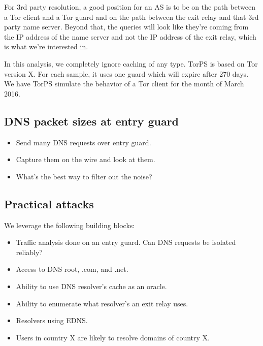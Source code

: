 For 3rd party resolution, a good position for an AS is to be on the path between 
a Tor client and a Tor guard and on the path between the exit relay and that 3rd party 
name server. Beyond that, the queries will look like they're coming from the IP address 
of the name server and not the IP address of the exit relay, which is what we're interested 
in. 

In this analysis, we completely ignore caching of any type. TorPS is based on Tor version X. 
For each sample, it uses one guard which will expire after 270 days. We have TorPS simulate
the behavior of a Tor client for the month of March 2016.


\subsection{DNS packet sizes at entry guard}
\begin{itemize}
	\item Send many DNS requests over entry guard.
	\item Capture them on the wire and look at them.
	\item What's the best way to filter out the noise?
\end{itemize}

\subsection{Practical attacks}
We leverage the following building blocks:
\begin{itemize}
	\item Traffic analysis done on an entry guard.  Can DNS requests be isolated
		reliably?
	\item Access to DNS root, .com, and .net.
	\item Ability to use DNS resolver's cache as an oracle.
	\item Ability to enumerate what resolver's an exit relay uses.
	\item Resolvers using EDNS.
	\item Users in country X are likely to resolve domains of country X.
\end{itemize}
